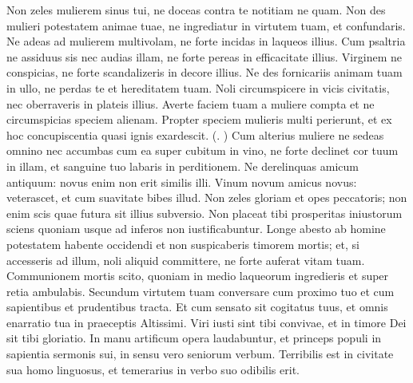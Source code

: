 \begin{biblechapter}
\begin{biblechapter}
\begin{biblechapter}
\begin{biblechapter}
\begin{biblechapter}
\begin{biblechapter}
\begin{biblechapter}
\begin{biblechapter}
\begin{biblechapter}
\verse Non zeles mulierem sinus tui,
 ne doceas contra te notitiam ne quam.
 \verse Non des mulieri potestatem animae tuae,
 ne ingrediatur in virtutem tuam, et confundaris.
 \verse Ne adeas ad mulierem multivolam, ne forte incidas in laqueos illius.
 \verse Cum psaltria ne assiduus sis nec audias illam,
 ne forte pereas in efficacitate illius.
 \verse Virginem ne conspicias,
 ne forte scandalizeris in decore illius.
 \verse Ne des fornicariis animam tuam in ullo,
 ne perdas te et hereditatem tuam.
 \verse Noli circumspicere in vicis civitatis,
 nec oberraveris in plateis illius.
 \verse Averte faciem tuam a muliere compta
 et ne circumspicias speciem alienam.
 \verse Propter speciem mulieris multi perierunt,
 et ex hoc concupiscentia quasi ignis exardescit. (\verse. \verse)
 \verse Cum alterius muliere ne sedeas omnino
 nec accumbas cum ea super cubitum in vino,
 \verse ne forte declinet cor tuum in illam, et sanguine tuo labaris in perditionem.
 \verse Ne derelinquas amicum antiquum:
 novus enim non erit similis illi.
 \verse Vinum novum amicus novus:
 veterascet, et cum suavitate bibes illud.
 \verse Non zeles gloriam et opes peccatoris;
 non enim scis quae futura sit illius subversio.
 \verse Non placeat tibi prosperitas iniustorum
 sciens quoniam usque ad inferos non iustificabuntur.
 \verse Longe abesto ab homine potestatem habente occidendi
 et non suspicaberis timorem mortis;
 \verse et, si accesseris ad illum, noli aliquid committere,
 ne forte auferat vitam tuam.
 \verse Communionem mortis scito,
 quoniam in medio laqueorum ingredieris
 et super retia ambulabis.
 \verse Secundum virtutem tuam conversare cum proximo tuo
 et cum sapientibus et prudentibus tracta.
 \verse Et cum sensato sit cogitatus tuus,
 et omnis enarratio tua in praeceptis Altissimi.
 \verse Viri iusti sint tibi convivae,
 et in timore Dei sit tibi gloriatio.
 \verse In manu artificum opera laudabuntur,
 et princeps populi in sapientia sermonis sui,
 in sensu vero seniorum verbum.
 \verse Terribilis est in civitate sua homo linguosus,
 et temerarius in verbo suo odibilis erit.
 

\end{biblechapter}
\end{biblechapter}
\end{biblechapter}
\end{biblechapter}
\end{biblechapter}
\end{biblechapter}
\end{biblechapter}
\end{biblechapter}
\end{biblechapter}
